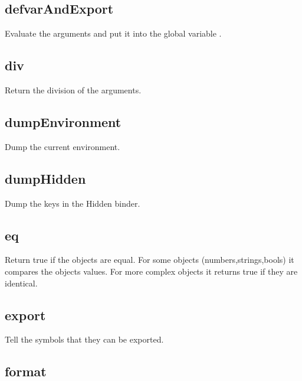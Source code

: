 \begin{itemize}
\subsection{defvarAndExport}
  \par

  Evaluate the arguments and put it into the global variable .

\subsection{div}
  \par

  Return the division of the arguments.

\subsection{dumpEnvironment}

  Dump the current environment.

\subsection{dumpHidden}

  Dump the keys in the Hidden binder.

\subsection{eq}
  \par

  Return true if the objects are equal. For some objects (numbers,strings,bools) it compares the objects values. For more complex objects it returns true if they are identical.

\subsection{export}

  Tell the symbols that they can be exported.


\subsection{format}
  \par


\end{itemize}
